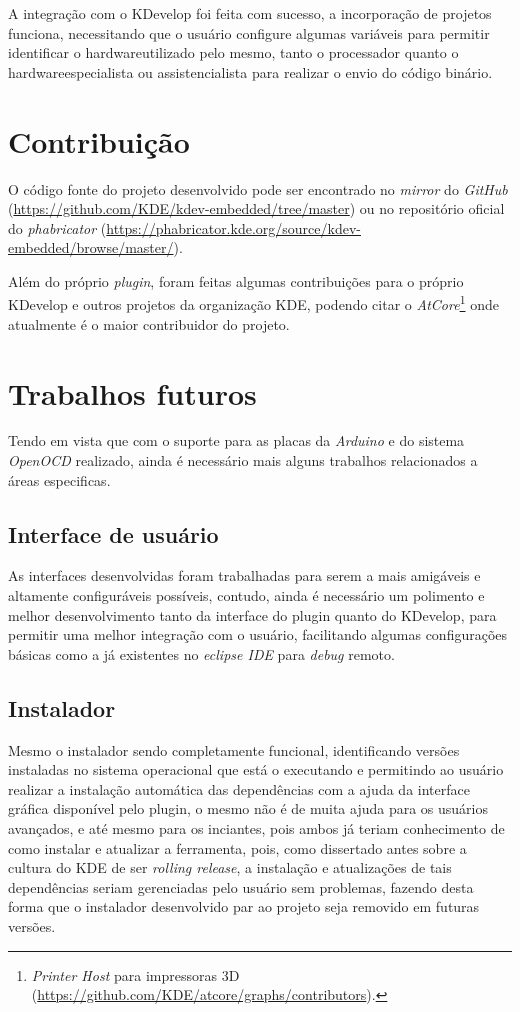 A integração com o KDevelop foi feita com sucesso, a incorporação de projetos funciona, necessitando que o usuário configure algumas variáveis para permitir identificar o hardwareutilizado pelo mesmo, tanto o processador quanto o hardwareespecialista ou assistencialista para realizar o envio do código binário.

\section{Contribuição}

O código fonte do projeto desenvolvido pode ser encontrado no \textit{mirror} do \textit{GitHub} (\url{https://github.com/KDE/kdev-embedded/tree/master}) ou no repositório oficial do \textit{phabricator} (\url{https://phabricator.kde.org/source/kdev-embedded/browse/master/}).

Além do próprio \textit{plugin}, foram feitas algumas contribuições para o próprio KDevelop e outros projetos da organização KDE, podendo citar o \textit{AtCore}\footnote{\textit{Printer Host} para impressoras 3D (\url{https://github.com/KDE/atcore/graphs/contributors}).} onde atualmente é o maior contribuidor do projeto.

\section{Trabalhos futuros}

Tendo em vista que com o suporte para as placas da \textit{Arduino} e do sistema \textit{OpenOCD} realizado, ainda é necessário mais alguns trabalhos relacionados a áreas especificas.

\subsection{Interface de usuário}
As interfaces desenvolvidas foram trabalhadas para serem a mais amigáveis e altamente configuráveis possíveis, contudo, ainda é necessário um polimento e melhor desenvolvimento tanto da interface do plugin quanto do KDevelop, para permitir uma melhor integração com o usuário, facilitando algumas configurações básicas como a já existentes no \textit{eclipse IDE} para \textit{debug} remoto.

\subsection{Instalador}
Mesmo o instalador sendo completamente funcional, identificando versões instaladas no sistema operacional que está o executando e
permitindo ao usuário realizar a instalação automática das dependências com a ajuda da interface gráfica disponível pelo plugin, o mesmo não é de muita ajuda para os usuários avançados, e até mesmo para os inciantes, pois ambos já teriam conhecimento de como instalar e atualizar a ferramenta, pois, como dissertado antes sobre a cultura do KDE de ser \textit{rolling release}, a instalação e atualizações de tais dependências seriam gerenciadas pelo usuário sem problemas, fazendo desta forma que o instalador desenvolvido par ao projeto seja removido em futuras versões.

